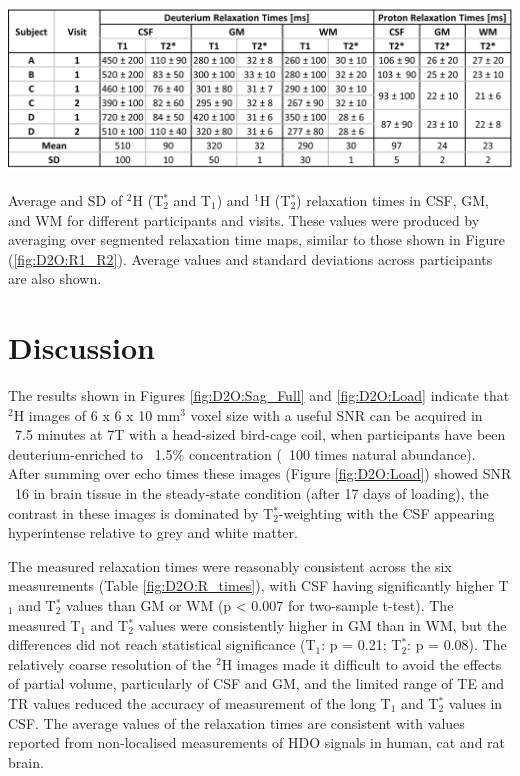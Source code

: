 \documentclass[class=article, crop=false]{standalone}
\begin{document}
\begin{table}[H]
    \centering
    \includegraphics[width=1\textwidth]{Figures/D2O/R_Times.png}
    \caption{Average and SD of $^2$H (T$_2^*$ and T$_1$) and $^1$H (T$_2^*$) relaxation times in CSF, GM, and WM for different participants and visits. These values were produced by averaging over segmented relaxation time maps, similar to those shown in Figure (\ref{fig:D2O:R1_R2}). Average values and standard deviations across participants are also shown.}
    \label{fig:D2O:R_times}
\end{table}
 
\section{Discussion}

The results shown in Figures \ref{fig:D2O:Sag_Full} and \ref{fig:D2O:Load} indicate that $^2$H images of 6 x 6 x 10 mm$^3$ voxel size with a useful SNR can be acquired in ~7.5 minutes at 7T with a head-sized bird-cage coil, when participants have been deuterium-enriched to ~1.5\% concentration (~100 times natural abundance). After summing over echo times these images (Figure \ref{fig:D2O:Load}) showed SNR ~16 in brain tissue in the steady-state condition (after 17 days of loading), the contrast in these images is dominated by T$_2^*$-weighting with the CSF appearing hyperintense relative to grey and white matter.

The measured relaxation times were reasonably consistent across the six measurements (Table \ref{fig:D2O:R_times}), with CSF having significantly higher T$_1$ and T$_2^*$ values than GM or WM (p < 0.007 for two-sample t-test). The measured T$_1$ and T$_2^*$ values were consistently higher in GM than in WM, but the differences did not reach statistical significance (T$_1$: p = 0.21; T$_2^*$: p = 0.08). The relatively coarse resolution of the $^2$H images made it difficult to avoid the effects of partial volume, particularly of CSF and GM, and the limited range of TE and TR values reduced the accuracy of measurement of the long T$_1$ and T$_2^*$ values in CSF. The average values of the relaxation times are consistent with values reported from non-localised measurements of HDO signals in human\cite{DeFeyter2018DeuteriumVivo,DeFeyter2021DeuteriumFuture,Ruhm2021DeuteriumResolution}, cat\cite{Ewy1988DeuteriumSitu} and rat \cite{DeFeyter2018DeuteriumVivo,Lu2017QuantitativeSpectroscopy} brain.
\end{document}
